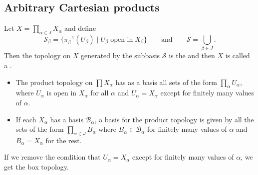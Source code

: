 \subsection{Arbitrary Cartesian products}
\begin{definition}
Let $X = \prod_{\alpha\in J}X_\alpha$ and define
\[ \mathcal{S}_\beta = \{\pi_\beta^{-1}(U_\beta)\;|\; U_\beta\;\text{open in}\;X_\beta\} \qquad \text{and}\qquad \mathcal{S} = \bigcup_{\beta\in J}.\]
Then the topology on $X$ generated by the subbasis $\mathcal{S}$ is the  and then $X$ is called a .
\end{definition}
\begin{lemma}
\begin{itemize}
\item The product topology on $\prod X_\alpha$ has as a basis all sets of the form $\prod_\alpha U_\alpha$, where $U_\alpha$ is open in $X_\alpha$ for all $\alpha$ and $U_\alpha = X_\alpha$ except for finitely many values of $\alpha$.
\item If each $X_\alpha$ has a basis $\mathcal{B}_\alpha$, a basis for the product topology is given by all the sets of the form $\prod_{\alpha\in J}B_\alpha$ where $B_\alpha\in\mathcal{B}_\alpha$ for finitely many values of $\alpha$ and $B_\alpha = X_\alpha$ for the rest.
\end{itemize}
\end{lemma}
If we remove the condition that $U_\alpha = X_\alpha$ except for finitely many values of $\alpha$, we get the box topology.

